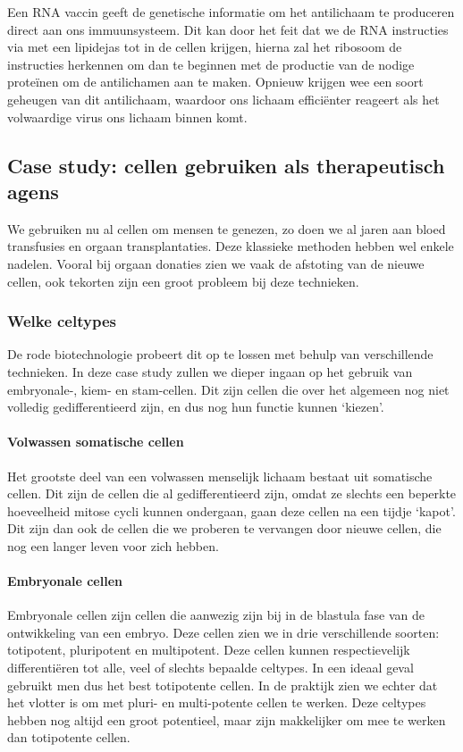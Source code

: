 \documentclass[a4paper,kul]{kulakarticle} %
\begin{document}
Een RNA vaccin geeft de genetische informatie om het antilichaam te produceren direct aan ons immuunsysteem. Dit kan door het feit dat we de RNA instructies via met een lipidejas tot in de cellen krijgen, hierna zal het ribosoom  de instructies herkennen om dan te beginnen met de productie van de nodige proteïnen om de antilichamen aan te maken. Opnieuw krijgen wee een soort geheugen van dit antilichaam, waardoor  ons lichaam efficiënter reageert als het volwaardige virus ons lichaam binnen komt.
\subsection[Case study]{Case study: cellen gebruiken als therapeutisch agens}
We gebruiken nu al cellen om mensen te genezen, zo doen we al jaren aan bloed transfusies en orgaan transplantaties. Deze klassieke methoden hebben wel enkele nadelen. Vooral bij orgaan donaties zien we vaak de afstoting van de nieuwe cellen, ook tekorten zijn een groot probleem bij deze technieken. 
\subsubsection{Welke celtypes}
De rode biotechnologie probeert dit op te lossen met behulp van verschillende technieken. In deze case study zullen we dieper ingaan op het gebruik van embryonale-, kiem- en stam-cellen. Dit zijn cellen die over het algemeen nog niet volledig gedifferentieerd zijn, en dus nog hun functie kunnen `kiezen'.
\paragraph{Volwassen somatische cellen}
Het grootste deel van een volwassen menselijk lichaam bestaat uit somatische cellen. Dit zijn de cellen die al gedifferentieerd zijn, omdat ze slechts een beperkte hoeveelheid mitose cycli kunnen ondergaan, gaan deze cellen na een tijdje `kapot'. Dit zijn dan ook de cellen die we proberen te vervangen door nieuwe cellen, die nog een langer leven voor zich hebben. 
\paragraph{Embryonale cellen}
Embryonale cellen zijn cellen die aanwezig zijn bij in de blastula fase van de ontwikkeling van een embryo. Deze cellen zien we in drie verschillende soorten: totipotent, pluripotent en multipotent. Deze cellen kunnen respectievelijk differentiëren tot alle, veel of slechts bepaalde celtypes. In een ideaal geval gebruikt men dus het best totipotente cellen. In de praktijk zien we echter dat het vlotter is om met pluri- en multi-potente cellen te werken. Deze celtypes hebben nog altijd een groot potentieel, maar zijn makkelijker om mee te werken dan totipotente cellen.   
\end{document}
